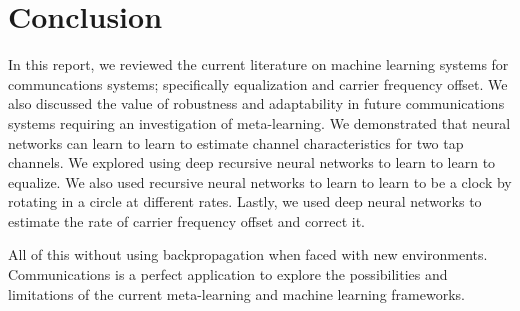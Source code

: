 \chapter{Conclusion}

In this report, we reviewed the current literature on machine learning systems for communcations systems; specifically equalization and carrier frequency offset.  We also discussed the value of robustness and adaptability in future communications systems requiring an investigation of meta-learning.
We demonstrated that neural networks can learn to learn to estimate channel characteristics for two tap channels.  We explored using deep recursive neural networks to learn to learn to equalize.
We also used recursive neural networks to learn to learn to be a clock by rotating in a circle at different rates.  Lastly, we used deep neural networks to estimate the rate of carrier frequency offset and correct it.

All of this without using backpropagation when faced with new environments.
Communications is a perfect application to explore the possibilities and limitations of the current meta-learning and machine learning frameworks.  
